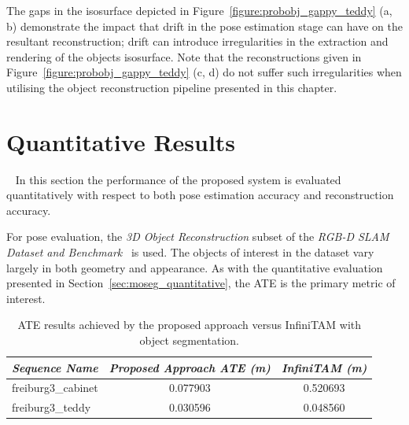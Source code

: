 The gaps in the isosurface depicted in Figure~\ref{figure:probobj_gappy_teddy} (a, b) 
demonstrate the impact that drift in the pose estimation stage can have on the resultant 
reconstruction; drift can introduce irregularities in the extraction and rendering of the objects 
isosurface. Note that the reconstructions given in Figure~\ref{figure:probobj_gappy_teddy} 
(c, d) do not suffer such irregularities when utilising the object reconstruction pipeline 
presented in this chapter.

\section{Quantitative Results}
~\label{sec:probobj_quantitative}
In this section the performance of the proposed system is evaluated quantitatively with respect 
to both pose estimation accuracy and reconstruction accuracy. 

For pose evaluation, the \textit{3D Object Reconstruction} subset of the 
\textit{RGB-D SLAM Dataset and Benchmark}~\cite{Sturm2012} is used\footnotemark. The objects 
of interest in the dataset vary largely in both geometry and appearance. As with the quantitative 
evaluation presented in Section~\ref{sec:moseg_quantitative}, the ATE is the primary metric of interest.
~
\begin{table}[!htbp]
  \centering
  \begin{tabular}{l c c}
    \emph{Sequence Name} & \emph{Proposed Approach ATE (m)} & \emph{InfiniTAM (m)}\\
    \midrule
    \textsf{freiburg3\_cabinet} & 0.077903 & 0.520693\\
    \textsf{freiburg3\_teddy}   & 0.030596 & 0.048560%
  \end{tabular}
  \caption[Probabilistic Object Reconstruction ATE]
  {ATE results achieved by the proposed approach versus InfiniTAM with object segmentation.}
~\label{table:probobj_ate}
\end{table}

